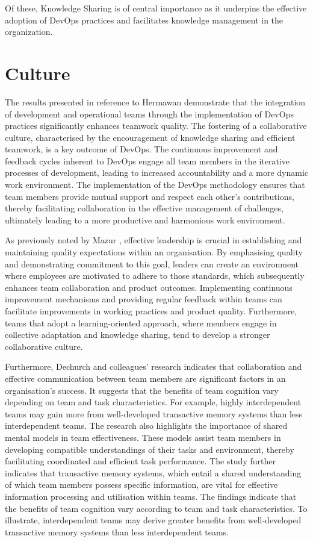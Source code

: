 Of these, Knowledge Sharing is of central importance as it underpins the effective adoption of DevOps practices and facilitates knowledge management in the organization. 
\cite{Azad2023DevOps}

\section{Culture}

The results presented in reference to Hermawan \cite{Hermawan2021DevOpsTeamwork} demonstrate that the integration of development and operational teams through the implementation of DevOps practices significantly enhances teamwork quality. The fostering of a collaborative culture, characterised by the encouragement of knowledge sharing and efficient teamwork, is a key outcome of DevOps. The continuous improvement and feedback cycles inherent to DevOps engage all team members in the iterative processes of development, leading to increased accountability and a more dynamic work environment. The implementation of the DevOps methodology ensures that team members provide mutual support and respect each other’s contributions, thereby facilitating collaboration in the effective management of challenges, ultimately leading to a more productive and harmonious work environment.

As previously noted by Mazur \cite{Mazur2023ProblemProductQuality}, effective leadership is crucial in establishing and maintaining quality expectations within an organisation. By emphasising quality and demonstrating commitment to this goal, leaders can create an environment where employees are motivated to adhere to those standards, which subsequently enhances team collaboration and product outcomes. Implementing continuous improvement mechanisms and providing regular feedback within teams can facilitate improvements in working practices and product quality. Furthermore, teams that adopt a learning-oriented approach, where members engage in collective adaptation and knowledge sharing, tend to develop a stronger collaborative culture.

Furthermore, Dechurch and colleagues' research \cite{Dechurch2010} indicates that collaboration and effective communication between team members are significant factors in an organisation's success. It suggests that the benefits of team cognition vary depending on team and task characteristics. For example, highly interdependent teams may gain more from well-developed transactive memory systems than less interdependent teams. The research also highlights the importance of shared mental models in team effectiveness. These models assist team members in developing compatible understandings of their tasks and environment, thereby facilitating coordinated and efficient task performance. The study further indicates that transactive memory systems, which entail a shared understanding of which team members possess specific information, are vital for effective information processing and utilisation within teams. The findings indicate that the benefits of team cognition vary according to team and task characteristics. To illustrate, interdependent teams may derive greater benefits from well-developed transactive memory systems than less interdependent teams.

